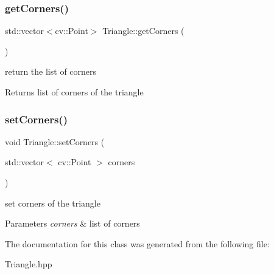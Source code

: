 \subsubsection{\texorpdfstring{get\+Corners()}{getCorners()}}
{\footnotesize\ttfamily std\+::vector$<$cv\+::\+Point$>$ Triangle\+::get\+Corners (\begin{DoxyParamCaption}{ }\end{DoxyParamCaption})}

return the list of corners \begin{DoxyReturn}{Returns}
list of corners of the triangle 
\end{DoxyReturn}
\mbox{\label{class_triangle_ad2d4cecee7e87e10d8b2787199d784c2}} 
\subsubsection{\texorpdfstring{set\+Corners()}{setCorners()}}
{\footnotesize\ttfamily void Triangle\+::set\+Corners (\begin{DoxyParamCaption}\item[{std\+::vector$<$ cv\+::\+Point $>$}]{corners }\end{DoxyParamCaption})}

set corners of the triangle 
\begin{DoxyParams}{Parameters}
{\em corners} & list of corners \\
\hline
\end{DoxyParams}


The documentation for this class was generated from the following file\+:\begin{DoxyCompactItemize}
\item 
Triangle.\+hpp\end{DoxyCompactItemize}
